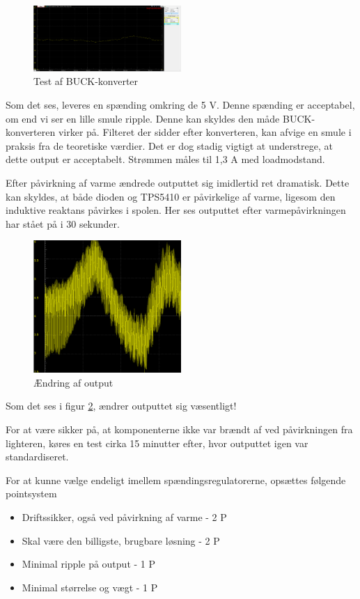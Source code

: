 \begin{figure}[h]
  \centering
  \includegraphics[width=0.5\textwidth]{./figurer/j10.png}
  \caption{Test af BUCK-konverter}
  \label{fig:j10}
\end{figure}

Som det ses, leveres en spænding omkring de 5 V. Denne spænding er acceptabel, om end vi ser en lille smule ripple. Denne kan skyldes den måde BUCK-konverteren virker på. Filteret der sidder efter konverteren, kan afvige en smule i praksis fra de teoretiske værdier. Det er dog stadig vigtigt at understrege, at dette output er acceptabelt. Strømmen måles til 1,3 A med loadmodstand.

Efter påvirkning af varme ændrede outputtet sig imidlertid ret dramatisk. Dette kan skyldes, at både dioden og TPS5410 er påvirkelige af varme, ligesom den induktive reaktans påvirkes i spolen. Her ses outputtet efter varmepåvirkningen har stået på i 30 sekunder. 

\begin{figure}[h]
  \centering
  \includegraphics[width=0.5\textwidth]{./figurer/j11.png}
  \caption{Ændring af output}
  \label{fig:j11}
\end{figure}


Som det ses i figur \ref{fig:j11}, ændrer outputtet sig væsentligt! 

For at være sikker på, at komponenterne ikke var brændt af ved påvirkningen fra lighteren, køres en test cirka 15 minutter efter, hvor outputtet igen var standardiseret. 

For at kunne vælge endeligt imellem spændingsregulatorerne, opsættes følgende pointsystem
\begin{itemize}
\item Driftssikker, også ved påvirkning af varme - 2 P
\item Skal være den billigste, brugbare løsning - 2 P
\item Minimal ripple på output - 1 P
\item Minimal størrelse og vægt - 1 P
\end{itemize}

